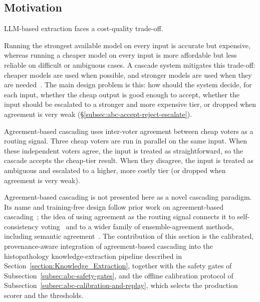 \subsection{Motivation}\label{subsec:abc-motivation}

LLM-based extraction faces a cost-quality trade-off. 

Running the strongest available model on every input is accurate but expensive, whereas running a cheaper model on every input is more affordable but less reliable on difficult or ambiguous cases. A cascade system mitigates this trade-off: cheaper models are used when possible, and stronger models are used when they are needed~\parencite{chen2023frugalgpt}. The main design problem is this: how should the system decide, for each input, whether the cheap output is good enough to accept, whether the input should be escalated to a stronger and more expensive tier, or dropped when agreement is very weak (§\ref{subsec:abc-accept-reject-escalate}).

Agreement-based cascading uses inter-voter agreement between cheap voters as a routing signal. Three cheap voters are run in parallel on the same input. When these independent voters agree, the input is treated as straightforward, so the cascade accepts the cheap-tier result. When they disagree, the input is treated as ambiguous and escalated to a higher, more costly tier (or dropped when agreement is very weak).

Agreement-based cascading is not presented here as a novel cascading paradigm. Its name and training-free design follow prior work on agreement-based cascading~\parencite{kolawole2025abc}; the idea of using agreement as the routing signal connects it to self-consistency voting~\parencite{wang2022selfconsistency} and to a wider family of ensemble-agreement methods, including semantic agreement~\parencite{soiffer2025semantic}. The contribution of this section is the calibrated, provenance-aware integration of agreement-based cascading into the histopathology knowledge-extraction pipeline described in Section~\ref{section:Knowledge_Extraction}, together with the safety gates of Subsection~\ref{subsec:abc-safety-gates}, and the offline calibration protocol of Subsection~\ref{subsec:abc-calibration-and-replay}, which selects the production scorer and the thresholds.